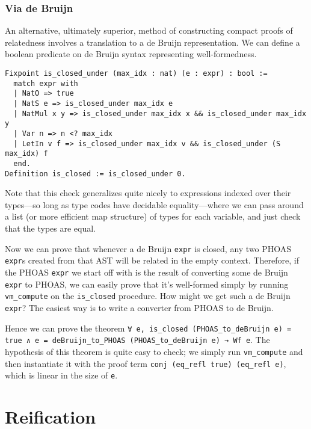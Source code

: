 
\subsubsection{Via de Bruijn} \label{sec:wf:perf:de-bruijn}

An alternative, ultimately superior, method of constructing compact proofs of relatedness involves a translation to a de Bruijn representation.
We can define a boolean predicate on de Bruijn syntax representing well-formedness.
\begin{verbatim}
Fixpoint is_closed_under (max_idx : nat) (e : expr) : bool :=
  match expr with
  | NatO => true
  | NatS e => is_closed_under max_idx e
  | NatMul x y => is_closed_under max_idx x && is_closed_under max_idx y
  | Var n => n <? max_idx
  | LetIn v f => is_closed_under max_idx v && is_closed_under (S max_idx) f
  end.
Definition is_closed := is_closed_under 0.
\end{verbatim}
Note that this check generalizes quite nicely to expressions indexed over their types---so long as type codes have decidable equality---where we can pass around a list (or more efficient map structure) of types for each variable, and just check that the types are equal.

Now we can prove that whenever a de Bruijn \texttt{expr} is closed, any two PHOAS \texttt{expr}s created from that AST will be related in the empty context.
Therefore, if the PHOAS \texttt{expr} we start off with is the result of converting some de Bruijn \texttt{expr} to PHOAS, we can easily prove that it's well-formed simply by running \texttt{vm_compute} on the \texttt{is_closed} procedure.
How might we get such a de Bruijn \texttt{expr}?
The easiest way is to write a converter from PHOAS to de Bruijn.

Hence we can prove the theorem \texttt{∀ e, is\_closed (PHOAS\_to\_deBruijn e) = true ∧ e = deBruijn\_to\_PHOAS (PHOAS\_to\_deBruijn e) → Wf e}.
The hypothesis of this theorem is quite easy to check; we simply run \texttt{vm_compute} and then instantiate it with the proof term \texttt{conj (eq_refl true) (eq_refl e)}, which is linear in the size of \texttt{e}.

\section{Reification}

